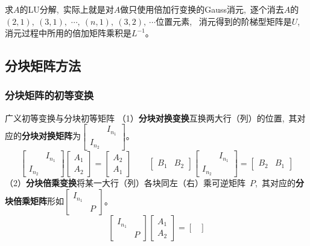 \documentclass[10pt, a4paper, oneside, fontset=none]{ctexart}
\theoremstyle{plain}
\theoremstyle{definition}
\newcommand{\com}{,\,\,\,\:}
\newcommand{\colors}[1]{\color{#1!75!black}}
\newcommand{\de}[2][]{\begin{defil}{#1}\kai #2\end{defil}}
\newcommand{\tboba}[1]{\textbf{\kai\color{bali!75!black}#1}}
\begin{document}
求$A$的LU分解\com 实际上就是对$A$做只使用倍加行变换的Gauss消元\com 逐个消去$A$的$(2,1),~(3,1),$ $\cdots,~(n,1),~(3,2),~\cdots$位置元素\com\!\! 消元得到的阶梯型矩阵是$U$\com\!\! 消元过程中所用的倍加矩阵乘积是$L^{-1}$。

\subsection{分块矩阵方法}
\subsubsection{分块矩阵的初等变换}
\de[广义初等变换与分块初等矩阵]{
    （1）\tboba{分块对换变换}\quad 互换两大行（列）的位置\com 其对应的\tboba{分块对换矩阵}为${\begin{bmatrix}
         & I_{n_1}\\ I_{n_2}&
    \end{bmatrix}}$。
    $$\begin{bmatrix}
        & I_{n_1}\\ I_{n_2}&
    \end{bmatrix}\begin{bmatrix}
        A_1\\A_2
    \end{bmatrix}=\begin{bmatrix}
        A_2\\A_1
    \end{bmatrix}\quad\quad \begin{bmatrix}
        B_1& B_2
    \end{bmatrix}\begin{bmatrix}
        & I_{n_1}\\ I_{n_2}&
    \end{bmatrix}=\begin{bmatrix}
        B_2 & B_1
    \end{bmatrix}$$
    （2）\tboba{分块倍乘变换}\quad 将某一大行（列）各块同左（右）乘{\colors{bali}可逆矩阵}~$P$\com 其对应的\tboba{分块倍乘矩阵}形如${\begin{bmatrix}
        I_{n_1} & \\ & P
    \end{bmatrix}}$。
    $$\begin{bmatrix}
        I_{n_1} & \\ & P
    \end{bmatrix}\begin{bmatrix}
        A_1\\A_2
    \end{bmatrix}=\begin{bmatrix}

\end{bmatrix}$$}
\end{document}
